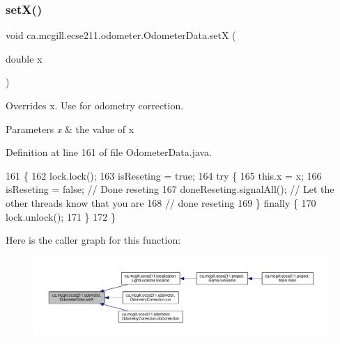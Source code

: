 \subsubsection{\texorpdfstring{set\+X()}{setX()}}
{\footnotesize\ttfamily void ca.\+mcgill.\+ecse211.\+odometer.\+Odometer\+Data.\+setX (\begin{DoxyParamCaption}\item[{double}]{x }\end{DoxyParamCaption})}

Overrides x. Use for odometry correction.


\begin{DoxyParams}{Parameters}
{\em x} & the value of x \\
\hline
\end{DoxyParams}


Definition at line 161 of file Odometer\+Data.\+java.


\begin{DoxyCode}
161                              \{
162     lock.lock();
163     isReseting = \textcolor{keyword}{true};
164     \textcolor{keywordflow}{try} \{
165       this.x = x;
166       isReseting = \textcolor{keyword}{false}; \textcolor{comment}{// Done reseting}
167       doneReseting.signalAll(); \textcolor{comment}{// Let the other threads know that you are}
168                                 \textcolor{comment}{// done reseting}
169     \} \textcolor{keywordflow}{finally} \{
170       lock.unlock();
171     \}
172   \}
\end{DoxyCode}
Here is the caller graph for this function\+:
\nopagebreak
\begin{figure}[H]
\begin{center}
\leavevmode
\includegraphics[width=350pt]{classca_1_1mcgill_1_1ecse211_1_1odometer_1_1_odometer_data_a2911d7215e47f3064defe016b46bfeef_icgraph}
\end{center}
\end{figure}
\mbox{\label{classca_1_1mcgill_1_1ecse211_1_1odometer_1_1_odometer_data_a2ebc18a13aea6276122d9ef4ee100bb9}} 
